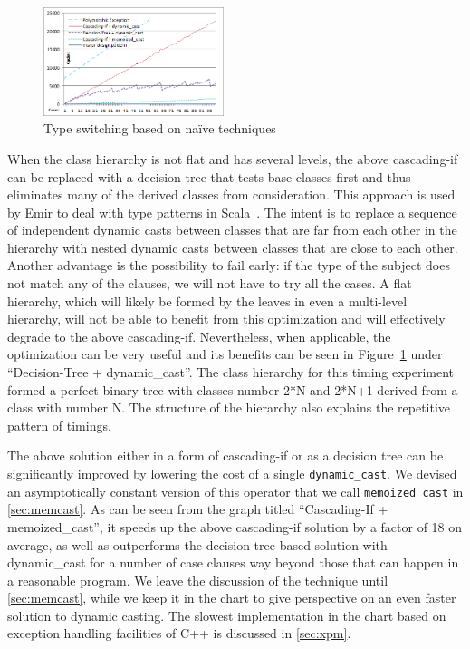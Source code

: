 \documentclass[preprint]{sigplanconf}
\makeatletter
\DeclareRobustCommand{\code}[1]{{\lstinline[breaklines=false,escapechar=@]{#1}}}
\makeatother
\begin{document}
\begin{figure}[htbp]
  \centering
    \includegraphics[width=0.47\textwidth]{DCast-vs-Visitors1.png}
  \caption{Type switching based on na\"ive techniques}
  \label{fig:DCastVis1}
\end{figure}

When the class hierarchy is not flat and has several levels, the above cascading-if can be replaced 
with a decision tree that tests base classes first and thus eliminates many of 
the derived classes from consideration. This approach is used by Emir to deal with 
type patterns in Scala~\cite[]{EmirThesis}. The intent is to 
replace a sequence of independent dynamic casts between classes that are far 
from each other in the hierarchy with nested dynamic casts between classes that 
are close to each other. Another advantage is the possibility to fail early: 
if the type of the subject does not match any of the clauses, we will not have to try all the cases. 
A flat hierarchy, which will likely be formed by the leaves in even a multi-level 
hierarchy, will not be able to benefit from this optimization and 
will effectively degrade to the above cascading-if. Nevertheless, when 
applicable, the optimization can be very useful and its benefits can be seen in
Figure~\ref{fig:DCastVis1} under ``Decision-Tree + dynamic\_cast''. The class 
hierarchy for this timing experiment formed a perfect binary tree with 
classes number 2*N and 2*N+1 derived from a class with number N. The structure 
of the hierarchy also explains the repetitive pattern of timings.

The above solution either in a form of cascading-if or as a decision tree can be 
significantly improved by lowering the cost of a single \code{dynamic_cast}. 
We devised an asymptotically constant version of this operator that we call
\code{memoized_cast} in \textsection\ref{sec:memcast}. As can be seen 
from the graph titled ``Cascading-If + memoized\_cast'', it speeds up the 
above cascading-if solution by a factor of 18 on average, as well as outperforms 
the decision-tree based solution with dynamic\_cast for a number of case clauses 
way beyond those that can happen in a reasonable program. 
We leave the discussion of the technique until 
\textsection\ref{sec:memcast}, while we keep it in the chart to give perspective on 
an even faster solution to dynamic casting. The slowest implementation in the 
chart based on exception handling facilities of C++ is discussed in 
\textsection\ref{sec:xpm}.
\end{document}
